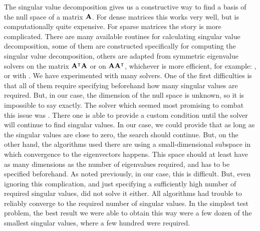 The singular value decomposition gives us a constructive way to find a basis of the null space of a matrix $\vb{A}$. For dense matrices this works very well, but is computationally quite expensive. For sparse matrices the story is more complicated. There are many available routines for calculating singular value decomposition, some of them are constructed specifically for computing the singular value decomposition, others are adapted from symmetric eigenvalue solvers on the matrix ${\vb{A}}^\intercal\vb{A}$ or on $\vb{A}{\vb{A}}^\intercal$, whichever is more efficient, for example: \slepc{} \cite{hernandez_slepc_2005}, \spectra{} \cite{qiu_yixuan_2022} or \scipy{} \cite{virtanen_scipy_2020} with \arpack{} \cite{lehoucq_arpack_1998}. We have experimented with many solvers. One of the first difficulties is that all of them require specifying beforehand how many singular values are required. But, in our case, the dimension of the null space is unknown, so it is impossible to say exactly. The solver which seemed most promising to combat this issue was \slepc{}. There one is able to provide a custom condition until the solver will continue to find singular values. In our case, we could provide that as long as the singular values are close to zero, the search should continue. But, on the other hand, the algorithms used there are using a small-dimensional subspace in which convergence to the eigenvectors happens. This space should at least have as many dimensions as the number of eigenvalues required, and has to be specified beforehand. As noted previously, in our case, this is difficult. But, even ignoring this complication, and just specifying a sufficiently high number of required singular values, did not solve it either. All algorithms had trouble to reliably converge to the required number of singular values. In the simplest test problem, the best result we were able to obtain this way were a few dozen of the smallest singular values, where a few hundred were required.


